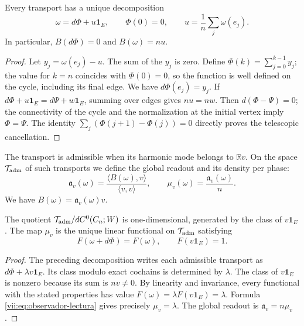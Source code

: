 \begin{theorem}
\label{vii:thm:observador-descomposicion}
Every transport has a unique decomposition
\[
 \omega=d\Phi+u\mathbf1_E,\qquad \Phi(0)=0,
 \qquad u=\frac1n\sum_j\omega(e_j).
\]
In particular, \(B(d\Phi)=0\) and \(B(\omega)=nu\).
\end{theorem}

\begin{proof}
Let \(y_j=\omega(e_j)-u\). The sum of the \(y_j\) is zero.
Define \(\Phi(k)=\sum_{j=0}^{k-1}y_j\); the value for \(k=n\)
coincides with \(\Phi(0)=0\), so the function is well defined
on the cycle, including its final edge. We have \(d\Phi(e_j)=y_j\).
If \(d\Phi+u\mathbf1_E=d\Psi+w\mathbf1_E\), summing over edges gives
\(nu=nw\). Then \(d(\Phi-\Psi)=0\); the connectivity of the cycle
and the normalization at the initial vertex imply \(\Phi=\Psi\).
The identity \(\sum_j(\Phi(j+1)-\Phi(j))=0\) directly proves
the telescopic cancellation.
\end{proof}

\begin{definition}
\label{vii:def:observador-admisible}
The transport is admissible when its harmonic mode belongs to
\(\mathbb Rv\). On the space \(\mathcal T_{\rm adm}\) of such
transports we define the global readout and its density per phase:
\begin{equation}
 \mathfrak a_v(\omega)
 =\frac{\langle B(\omega),v\rangle}{\langle v,v\rangle},
 \qquad
 \mu_v(\omega)=\frac{\mathfrak a_v(\omega)}n.
 \label{vii:eq:observador-lectura}
\end{equation}
We have \(B(\omega)=\mathfrak a_v(\omega)v\).
\end{definition}

\begin{theorem}
\label{vii:thm:observador-unicidad}
The quotient
\(\mathcal T_{\rm adm}/dC^0(C_n;W)\) is one-dimensional, generated
by the class of \(v\mathbf1_E\). The map \(\mu_v\) is the
unique linear functional on \(\mathcal T_{\rm adm}\) satisfying
\[
 F(\omega+d\Phi)=F(\omega),\qquad F(v\mathbf1_E)=1.
\]
\end{theorem}

\begin{proof}
The preceding decomposition writes each admissible transport as
\(d\Phi+\lambda v\mathbf1_E\). Its class modulo exact cochains
is determined by \(\lambda\). The class of \(v\mathbf1_E\)
is nonzero because its sum is \(nv\neq0\). By linearity and
invariance, every functional with the stated properties has value
\(F(\omega)=\lambda F(v\mathbf1_E)=\lambda\). Formula
\eqref{vii:eq:observador-lectura} gives precisely \(\mu_v=\lambda\).
The global readout is \(\mathfrak a_v=n\mu_v\).
\end{proof}

